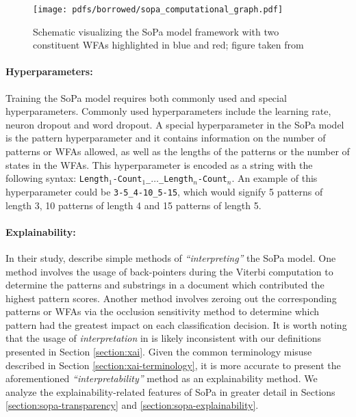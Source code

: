 \begin{figure}[t]
  \centering
  \texttt{[image: pdfs/borrowed/sopa\_computational\_graph.pdf]}
  \caption{Schematic visualizing the SoPa model framework with two constituent WFAs highlighted in blue and red; figure taken from \citet{schwartz2018sopa}}
  \label{fig:sopa}
\end{figure}

\paragraph{Hyperparameters:} Training the SoPa model requires both commonly used and special hyperparameters. Commonly used hyperparameters include the learning rate, neuron dropout and word dropout. A special hyperparameter in the SoPa model is the pattern hyperparameter and it contains information on the number of patterns or WFAs allowed, as well as the lengths of the patterns or the number of states in the WFAs. This hyperparameter is encoded as a string with the following syntax: \texttt{Length$_{1}$-Count$_{1}$\_$\dots$\_Length$_{n}$-Count$_{n}$}. An example of this hyperparameter could be \texttt{3-5\_4-10\_5-15}, which would signify 5 patterns of length 3, 10 patterns of length 4 and 15 patterns of length 5.

\paragraph{Explainability:} In their study, \citet[Page 7, Section 7]{schwartz2018sopa} describe simple methods of \textit{``interpreting''} the SoPa model. One method involves the usage of back-pointers during the Viterbi computation to determine the patterns and substrings in a document which contributed the highest pattern scores. Another method involves zeroing out the corresponding patterns or WFAs via the occlusion sensitivity method to determine which pattern had the greatest impact on each classification decision. It is worth noting that the usage of \textit{interpretation} in \citet{schwartz2018sopa} is likely inconsistent with our definitions presented in Section \ref{section:xai}. Given the common terminology misuse described in Section \ref{section:xai-terminology}, it is more accurate to present the aforementioned \textit{``interpretability''} method as an explainability method. We analyze the explainability-related features of SoPa in greater detail in Sections \ref{section:sopa-transparency} and \ref{section:sopa-explainability}. 

